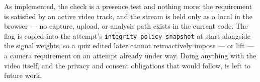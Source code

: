As implemented, the check is a presence test and nothing more: the requirement is satisfied by an active video track, and the stream is held only as a local  in the browser --- no capture, upload, or analysis path exists in the current code. The flag is copied into the attempt's \texttt{integrity\_policy\_snapshot} at start alongside the signal weights, so a quiz edited later cannot retroactively impose --- or lift --- a camera requirement on an attempt already under way. Doing anything with the video itself, and the privacy and consent obligations that would follow, is left to future work.
